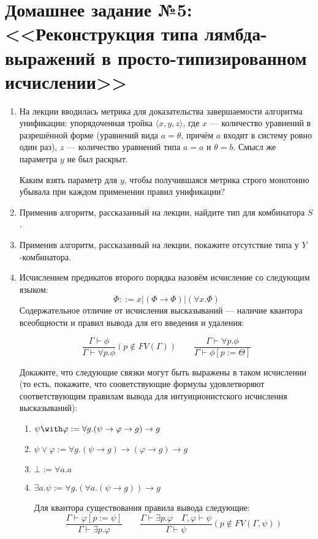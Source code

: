 \documentclass[10pt,a4paper,oneside]{article}
\begin{document}
\section*{Домашнее задание №5: <<Реконструкция типа лямбда-выражений в просто-типизированном исчислении>>}
\begin{enumerate}
\item На лекции вводилась метрика для доказательства завершаемости алгоритма унификации: упорядоченная тройка $\langle x,y,z \rangle$,
где $x$ --- количество уравнений в разрешённой форме (уравнений вида $a = \theta$, причём $a$ входит в систему ровно один раз), 
$z$ --- количество уравнений типа $a=a$ и $\theta=b$. Смысл же параметра $y$ не был раскрыт.

Каким взять параметр для $y$, чтобы получившаяся метрика строго монотонно убывала при каждом применении правил унификации?

\item Применив алгоритм, рассказанный на лекции, найдите тип для комбинатора $S$.
\item Применив алгоритм, рассказанный на лекции, покажите отсутствие типа у $Y$-комбинатора.

\item Исчислением предикатов второго порядка назовём исчисление со следующим языком:
$$\Phi ::= x | (\Phi \rightarrow \Phi) | (\forall x.\Phi)$$
Содержательное отличие от исчисления высказываний --- наличие квантора всеобщности и правил вывода для его введения и удаления: 

    \[ \dfrac{\Gamma\vdash\phi}{\Gamma\vdash\forall p.\phi} (p\notin FV(\Gamma)) \qquad
        \dfrac{\Gamma\vdash\forall p.\phi}{\Gamma\vdash\phi[p:=\Theta]} \]

Докажите, что следующие связки могут быть выражены в таком исчислении (то есть, покажите, что сооветствующие формулы
удовлетворяют соответствующим правилам вывода для интуиционистского исчисления высказываний):
\begin{enumerate}
\item $\psi \with \varphi := \forall g.(\psi \rightarrow \varphi \rightarrow g) \rightarrow g$
\item $\psi \vee \varphi := \forall g.(\psi \rightarrow g) \rightarrow (\varphi \rightarrow g) \rightarrow g$
\item $\bot := \forall a.a$
\item $\exists a.\psi := \forall g.(\forall a.(\psi \rightarrow g)) \rightarrow g$

Для квантора существования правила вывода следующие:
    \[ \dfrac{\Gamma\vdash\varphi[p:= \psi]}{\Gamma\vdash\exists p.\varphi}\qquad
        \dfrac{\Gamma\vdash\exists p.\varphi\quad\Gamma, \varphi\vdash\psi}{\Gamma\vdash\psi} (p\notin FV(\Gamma, \psi)) \]
\end{enumerate}

\end{enumerate}
\end{document}
